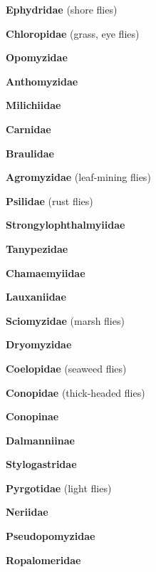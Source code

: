 \documentclass[letterpaper,10pt]{article}
\begin{document}
{\makebox[0.6cm]{}  \textbf{Ephydridae} (shore flies) \par
\makebox[0.6cm]{}  \textbf{Chloropidae} (grass, eye flies) \par
\makebox[0.6cm]{}  \textbf{Opomyzidae}  \par
\makebox[0.6cm]{}  \textbf{Anthomyzidae} \par
\makebox[0.6cm]{}  \textbf{Milichiidae} \par
\makebox[0.6cm]{}  \textbf{Carnidae} \par
\makebox[0.6cm]{}  \textbf{Braulidae} \par
\makebox[0.6cm]{}  \textbf{Agromyzidae} (leaf-mining flies) \par
\makebox[0.6cm]{}  \textbf{Psilidae} (rust flies) \par
\makebox[0.6cm]{}  \textbf{Strongylophthalmyiidae} \par
\makebox[0.6cm]{}  \textbf{Tanypezidae} \par
\makebox[0.6cm]{}  \textbf{Chamaemyiidae} \par
\makebox[0.6cm]{}  \textbf{Lauxaniidae} \par
\makebox[0.6cm]{}  \textbf{Sciomyzidae} (marsh flies) \par
\makebox[0.6cm]{}  \textbf{Dryomyzidae} \par
\makebox[0.6cm]{}  \textbf{Coelopidae} (seaweed flies) \par
\makebox[0.6cm]{}  \textbf{Conopidae} (thick-headed flies) \par
\makebox[0.8cm]{}  \textbf{Conopinae} \par
\makebox[0.8cm]{}  \textbf{Dalmanniinae} \par
\makebox[0.6cm]{}  \textbf{Stylogastridae} \par
\makebox[0.6cm]{}  \textbf{Pyrgotidae} (light flies) \par
\makebox[0.6cm]{}  \textbf{Neriidae} \par
\makebox[0.6cm]{}  \textbf{Pseudopomyzidae} \par
\makebox[0.6cm]{}  \textbf{Ropalomeridae} \par
}
\end{document}
